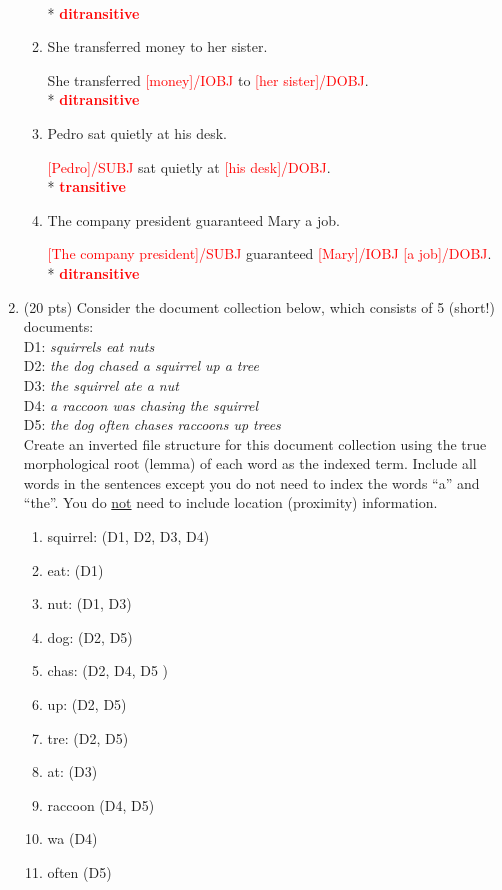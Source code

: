 \documentclass[11pt]{article}
\begin{document}
\begin{enumerate}
\begin{enumerate}
\\* \textcolor{red}{{\bf ditransitive}}
\item She transferred money to her sister.
\par She transferred \textcolor{red}{[money]/IOBJ} to \textcolor{red}{[her sister]/DOBJ}.
\\* \textcolor{red}{{\bf ditransitive}}
\item Pedro sat quietly at his desk. 
\par \textcolor{red}{[Pedro]/SUBJ} sat quietly at \textcolor{red}{[his desk]/DOBJ}. 
\\* \textcolor{red}{{\bf transitive}}
\item The company president guaranteed Mary a job. 
\par \textcolor{red}{[The company president]/SUBJ} guaranteed \textcolor{red}{[Mary]/IOBJ} \textcolor{red}{[a job]/DOBJ}. 
\\* \textcolor{red}{{\bf ditransitive}}
\end{enumerate}


\newpage
\item (20 pts) Consider the document collection below, which consists of
5 (short!) documents: \\ 

\noindent
D1: {\it squirrels eat nuts} \\
D2: {\it the dog chased a squirrel up a tree} \\
D3: {\it the squirrel ate a nut} \\
D4: {\it a raccoon was chasing the squirrel} \\
D5: {\it the dog often chases raccoons up trees} \\

Create an inverted file structure for this document collection
using the true morphological root (lemma) of each word as the indexed
term. Include all words in the sentences except you do not need to
index the words ``a'' and ``the''. You do \underline{not} need to
include location (proximity) information. 

\begin {enumerate}
\color{red}
\item squirrel: (D1, D2, D3, D4)
\item eat: (D1)
\item nut: (D1, D3)
\item dog: (D2, D5)
\item chas: (D2, D4, D5 )
\item up: (D2, D5)
\item tre: (D2, D5)
\item at: (D3)
\item raccoon (D4, D5)
\item wa (D4)
\item often (D5)
\end{enumerate}


\end{enumerate}
\end{document}
